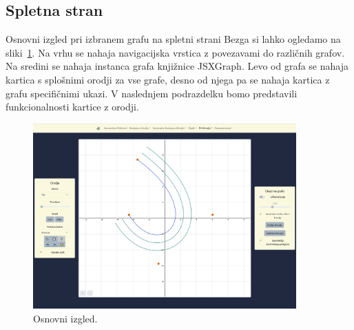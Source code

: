 \documentclass[isrm2, tisk]{fmfdelo}
\begin{document}
    \subsection{Spletna stran}
    Osnovni izgled pri izbranem grafu na spletni strani Bezga si lahko ogledamo na sliki~\ref{fig:bezeg:osnovni-izgled}.
    Na vrhu se nahaja navigacijska vrstica z povezavami do različnih grafov.
    Na sredini se nahaja instanca grafa knjižnice JSXGraph.
    Levo od grafa se nahaja kartica s splošnimi orodji za vse grafe, desno od njega pa se nahaja kartica z grafu specifičnimi ukazi.
    V naslednjem podrazdelku bomo predstavili funkcionalnosti kartice z orodji.
    \begin{figure}[h]
        \centering
        \includegraphics[width = 0.90\textwidth]{images/bezeg/osnovni-izgled}
        \caption{Osnovni izgled.}
        \label{fig:bezeg:osnovni-izgled}
    \end{figure}
\end{document}
